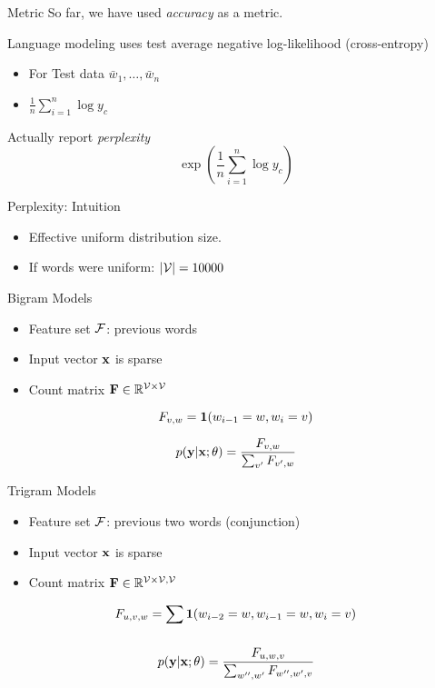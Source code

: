 \documentclass{beamer}
\begin{document}
\begin{frame}{Metric}
  So far, we have used \textit{accuracy} as a metric.

  Language modeling uses test average negative log-likelihood (cross-entropy)
  \begin{itemize}
    \item For Test data $\bar{w}_1, \ldots, \bar{w}_n$
    \item $\frac{1}{n}\sum_{i=1}^n \log y_c$
  \end{itemize}


  Actually report \textit{perplexity}
  \[ \exp(\frac{1}{n}\sum_{i=1}^n \log y_c) \]
\end{frame}

\begin{frame}{Perplexity: Intuition}
  \begin{itemize}
  \item Effective uniform distribution size.
  \item If words were uniform: $|\mathcal{V}| = 10000$
  \end{itemize}
\end{frame}


\begin{frame}{Bigram Models}
  \begin{itemize}
  \item Feature set $\mathcal{F}$: previous words
  \item Input vector $\mathbf{x}$ is sparse
  \item Count matrix $\mathbf{F} \in \mathbb{R}^{\mathcal{V} \times \mathcal{V}} $
  \end{itemize}

  \[ F_{v, w}  =  \mathbf{1}(w_{i-1} = w, w_i = v)  \]

  \[p(\mathbf{y} | \mathbf{x};\theta) = \frac{F_{v, w}}{\sum_{v'} F_{v', w}} \]
\end{frame}


\begin{frame}{Trigram Models}
  \begin{itemize}
  \item Feature set $\mathcal{F}$: previous two words (conjunction)
  \item Input vector $\mathbf{x}$ is sparse
  \item Count matrix $\mathbf{F} \in \mathbb{R}^{\mathcal{V} \times \mathcal{V}, \mathcal{V}} $
  \end{itemize}

  \[ F_{u, v, w}  = \sum_{} \mathbf{1}(w_{i-2} = w, w_{i-1} = w, w_i = v)  \]

  \[p(\mathbf{y} | \mathbf{x};\theta) = \frac{F_{u, w, v}}{\sum_{w'', w'} F_{w'', w',v}} \]
\end{frame}
\end{document}
